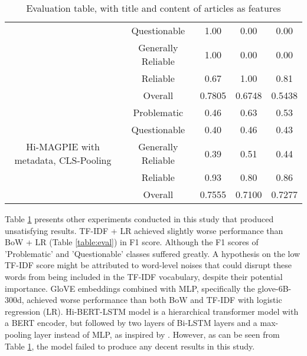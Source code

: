 \begin{table}[htbp]
\begin{longtable}{| c | c | c | c | c |}
                                                              & Questionable       & 1.00               & 0.00            & 0.00        \\
                                                              & Generally Reliable & 1.00               & 0.00            & 0.00        \\
                                                              & Reliable           & 0.67               & 1.00            & 0.81        \\\cline{2-5}
                                                              & Overall            & 0.7805             & 0.6748          & 0.5438      \\
        \hline
        \multirow{5}{*}{Hi-MAGPIE with metadata, CLS-Pooling} & Problematic        & 0.46               & 0.63            & 0.53        \\
                                                              & Questionable       & 0.40               & 0.46            & 0.43        \\
                                                              & Generally Reliable & 0.39               & 0.51            & 0.44        \\
                                                              & Reliable           & 0.93               & 0.80            & 0.86        \\\cline{2-5}
                                                              & Overall            & 0.7555             & 0.7100          & 0.7277      \\
        \hline
    \end{longtable}
    \caption{Evaluation table, with title and content of articles as features}
    \label{table:eval_failed}
\end{table}

Table \ref{table:eval_failed} presents other experiments conducted in this study that produced unsatisfying results. TF-IDF + LR achieved slightly worse performance than BoW + LR (Table \ref{table:eval}) in F1 score. Although the F1 scores of 'Problematic' and 'Questionable' classes suffered greatly. A hypothesis on the low TF-IDF score might be attributed to word-level noises that could disrupt these words from being included in the TF-IDF vocabulary, despite their potential importance. GloVE embeddings combined with MLP, specifically the glove-6B-300d, achieved worse performance than both BoW and TF-IDF with logistic regression (LR). Hi-BERT-LSTM model is a hierarchical transformer model with a BERT encoder, but followed by two layers of Bi-LSTM layers and a max-pooling layer instead of MLP, as inspired by \cite{khandve-2022-hierarchical-longdoc}. However, as can be seen from Table \ref{table:eval_failed}, the model failed to produce any decent results in this study.


